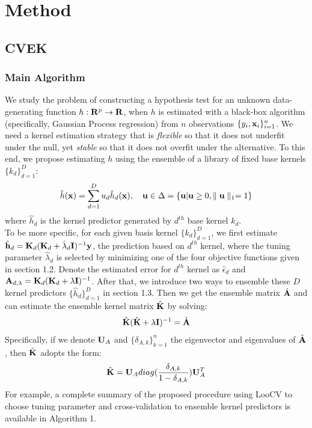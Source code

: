 \documentclass[11pt]{article}
\begin{document}
\section{{\bf Method}}
\subsection{\textbf{CVEK}}
\setcounter{equation}{0}
\renewcommand{\theequation}{2.1.\arabic{equation}}
\subsubsection{{Main Algorithm}}
We study the problem of constructing a hypothesis test for an unknown data-generating function $h: {\bf R}^p\rightarrow {\bf R}$, when $h$ is estimated with a black-box algorithm (specifically, Gaussian Process regression) from $n$ observations $\{y_i, {\bf x}_i\}_{i=1}^n$. We need a kernel estimation strategy \citep{liu_robust_2017} that is \textsl{flexible} so that it does not underfit under the null, yet \textsl{stable} so that it does not overfit under the alternative. To this end, we propose estimating $h$ using the ensemble of a library of fixed base kernels $\{k_d\}_{d=1}^D$:
\begin{align}
\hat{h}({\bf x})=\sum_{d=1}^D u_d\hat{h}_d({\bf x}), \quad {\bf u} \in \Delta=\{{\bf u} | {\bf u} \geq 0, \parallel {\bf u} \parallel_1=1\}
\end{align}
where $\hat{h}_d$ is the kernel predictor generated by $d^{th}$ base kernel $k_d$.\\
To be more specific, for each given basis kernel $\{k_d\}_{d=1}^D$, we first estimate $\hat{{\bf h}}_d={\bf K}_d({\bf K}_d+\hat{\lambda}_d{\bf I})^{-1}{\bf y}$, the prediction based on $d^{th}$ kernel, where the tuning parameter $\hat{\lambda}_d$ is selected by minimizing one of the four objective functions given in section 1.2. Denote the estimated error for $d^{th}$ kernel as $\hat{\epsilon}_d$ and ${\bf A}_{d,\lambda}={\bf K}_d({\bf K}_d+\lambda{\bf I})^{-1}$. After that, we introduce two ways to ensemble these $D$ kernel predictors $\{\hat{h}_d\}_{d=1}^D$ in section 1.3. Then we get the ensemble matrix $\hat{{\bf A}}$ and can estimate the ensemble kernel matrix $\hat{{\bf K}}$ by solving:
\begin{align*}
\hat{{\bf K}}(\hat{{\bf K}}+\lambda {\bf I})^{-1}=\hat{{\bf A}}
\end{align*}
Specifically, if we denote ${\bf U}_A$ and $\{\delta_{A,k}\}_{k=1}^n$ the eigenvector and eigenvalues of $\hat{{\bf A}}$, then $\hat{{\bf K}}$ adopts the form:
\begin{align*}
\hat{{\bf K}}={\bf U}_A diag(\frac{\delta_{A,k}}{1-\delta_{A,k}}){\bf U}_A^T
\end{align*}
For example, a complete summary of the proposed procedure using LooCV to choose tuning parameter and cross-validation to ensemble kernel predictors is available in Algorithm 1.
\end{document}
